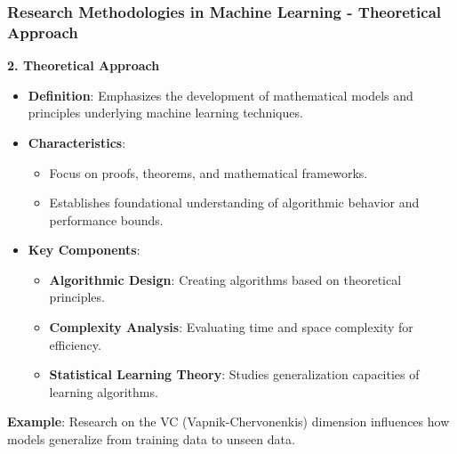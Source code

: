 \documentclass[aspectratio=169]{beamer}
\begin{document}
\begin{frame}[fragile]
    \frametitle{Research Methodologies in Machine Learning - Theoretical Approach}

    \textbf{2. Theoretical Approach}
    \begin{itemize}
        \item \textbf{Definition}: Emphasizes the development of mathematical models and principles underlying machine learning techniques.
        \item \textbf{Characteristics}:
            \begin{itemize}
                \item Focus on proofs, theorems, and mathematical frameworks.
                \item Establishes foundational understanding of algorithmic behavior and performance bounds.
            \end{itemize}
        \item \textbf{Key Components}:
            \begin{itemize}
                \item \textbf{Algorithmic Design}: Creating algorithms based on theoretical principles.
                \item \textbf{Complexity Analysis}: Evaluating time and space complexity for efficiency.
                \item \textbf{Statistical Learning Theory}: Studies generalization capacities of learning algorithms.
            \end{itemize}
    \end{itemize}

    \textbf{Example}: Research on the VC (Vapnik-Chervonenkis) dimension influences how models generalize from training data to unseen data.

\end{frame}
\end{document}
